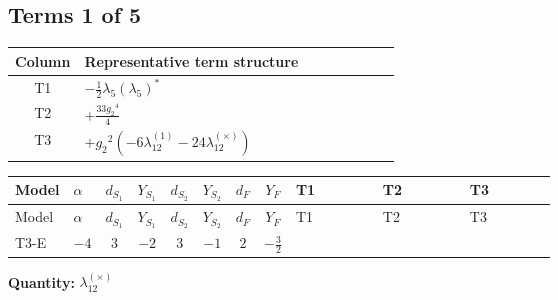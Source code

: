 \documentclass[8pt]{article}
\begin{document}
\begin{landscape}
\subsection*{Terms 1 of 5}
\begin{center}
\begin{tabular}{@{}c >{\raggedright\arraybackslash}p{0.82\linewidth}@{}}
\toprule
Column & Representative term structure \\
\midrule
T1 & \(\displaystyle -\frac{1}{2} {\lambda_5} \left({\lambda_5}\right)^{*}\) \\
\midrule
T2 & \(\displaystyle +\frac{33 {g_2}^4}{4}\) \\
\midrule
T3 & \(\displaystyle +{g_2}^2 (-6 {\lambda_{12}^{(1)}}-24 {\lambda_{12}^{(\times)}})\) \\
\midrule
\bottomrule
\end{tabular}
\end{center}
\smallskip
\tiny
\begin{longtable}{@{}llcccccc >{\raggedright\arraybackslash}p{0.21\linewidth} >{\raggedright\arraybackslash}p{0.21\linewidth} >{\raggedright\arraybackslash}p{0.21\linewidth}@{}}
\toprule
Model & $\alpha$ & $d_{S_1}$ & $Y_{S_1}$ & $d_{S_2}$ & $Y_{S_2}$ & $d_F$ & $Y_F$ & T1 & T2 & T3 \\
\midrule
\endfirsthead
\toprule
Model & $\alpha$ & $d_{S_1}$ & $Y_{S_1}$ & $d_{S_2}$ & $Y_{S_2}$ & $d_F$ & $Y_F$ & T1 & T2 & T3 \\
\midrule
\endhead
T3-E & $-4$ & $3$ & $-2$ & $3$ & $-1$ & $2$ & $-\frac{3}{2}$ & \scriptsize\adjustbox{max width=\linewidth}{$\begin{gathered} -\frac{1}{2} {\lambda_5} \left({\lambda_5}\right)^{*}\end{gathered}$} & \scriptsize\adjustbox{max width=\linewidth}{$\begin{gathered} +\frac{33 {g_2}^4}{4}\end{gathered}$} & \scriptsize\adjustbox{max width=\linewidth}{$\begin{gathered} +{g_2}^2 (-6 {\lambda_{12}^{(1)}}-24 {\lambda_{12}^{(\times)}})\end{gathered}$} \\
\midrule
\bottomrule
\end{longtable}
\clearpage
\noindent\textbf{Quantity: }$\lambda_{12}^{(\times)}$\par\smallskip

\end{landscape}
\end{document}
